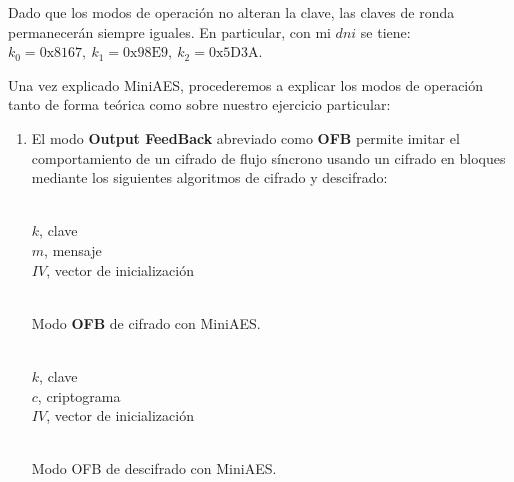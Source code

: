 	Dado que los modos de operación no alteran la clave, las claves de ronda permanecerán siempre iguales. En
	particular, con mi $dni$ se tiene: $k_0 = \mathrm{0x8167},\ k_1 = \mathrm{0x98E9},\ k_2 = \mathrm{0x5D3A}$.
	
	Una vez explicado MiniAES, procederemos a explicar los modos de operación tanto de forma teórica como sobre
	nuestro ejercicio particular:
	
	\begin{enumerate}
		\item El modo \textbf{Output FeedBack} abreviado como \textbf{OFB} permite imitar el comportamiento de
		un cifrado de flujo síncrono usando un cifrado en bloques mediante los siguientes algoritmos de cifrado
		y descifrado:
		\begin{algorithm}[H]
			\begin{algorithmic}[1]
				\REQUIRE \ \\
					\texttt{$k$}, clave\\
					\texttt{$m$}, mensaje\\
					\texttt{$IV$}, vector de inicialización\\ \
				\ENDFOR
			\end{algorithmic}
			\caption{Modo \textbf{OFB} de cifrado con MiniAES.}
			\label{EncOFB}
		\end{algorithm}
		
		\begin{algorithm}[H]
			\begin{algorithmic}[1]
				\REQUIRE \ \\
					\texttt{$k$}, clave\\
					\texttt{$c$}, criptograma\\
					\texttt{$IV$}, vector de inicialización\\ \
				\STATE{\texttt{$x = IV$}}
				\ENDFOR
			\end{algorithmic}
			\caption{Modo OFB de descifrado con MiniAES.}
			\label{DecOFB}
		\end{algorithm}
		

\end{enumerate}
